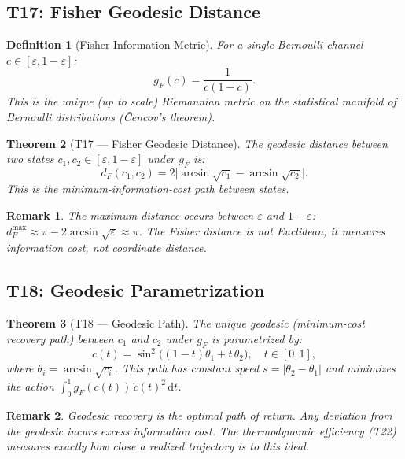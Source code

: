 \documentclass[
  aps,
  prd,
  preprint,
  superscriptaddress,
  nofootinbib,
  floatfix,
  longbibliography
]{revtex4-2}
\newtheorem{theorem}{Theorem}
\newtheorem{definition}[theorem]{Definition}
\newtheorem{remark}{Remark}
\newcommand{\eps}{\varepsilon}
\newcommand{\dd}{\mathrm{d}}
\newcommand{\beq}{\begin{equation}}
\newcommand{\eeq}{\end{equation}}
\newcommand{\dFisher}{d_{\!F}}
\newcommand{\gFisher}{g_{\!F}}
\begin{document}
\subsection{T17: Fisher Geodesic Distance}

\begin{definition}[Fisher Information Metric]\label{def:fisher}
For a single Bernoulli channel $c \in [\eps, 1-\eps]$:
\beq
  \gFisher(c) = \frac{1}{c(1-c)}.
\eeq
This is the unique (up to scale) Riemannian metric
on the statistical manifold of Bernoulli distributions
(Čencov's theorem).
\end{definition}

\begin{theorem}[T17 — Fisher Geodesic Distance]\label{thm:T17}
The geodesic distance between two states
$c_1, c_2 \in [\eps, 1-\eps]$ under $\gFisher$ is:
\beq
  \dFisher(c_1, c_2) =
    2\bigl|\arcsin\!\sqrt{c_1} - \arcsin\!\sqrt{c_2}\bigr|.
\eeq
This is the minimum-information-cost path between states.
\end{theorem}

\begin{remark}
The maximum distance occurs between $\eps$ and $1-\eps$:
$\dFisher^{\max} \approx \pi - 2\arcsin\!\sqrt{\eps} \approx \pi$.
The Fisher distance is not Euclidean; it measures
information cost, not coordinate distance.
\end{remark}

\subsection{T18: Geodesic Parametrization}

\begin{theorem}[T18 — Geodesic Path]\label{thm:T18}
The unique geodesic (minimum-cost recovery path) between
$c_1$ and $c_2$ under $\gFisher$ is parametrized by:
\beq
  c(t) = \sin^2\!\bigl((1-t)\theta_1 + t\,\theta_2\bigr),
  \quad t \in [0,1],
\eeq
where $\theta_i = \arcsin\!\sqrt{c_i}$.
This path has constant speed $\dot{s} = |\theta_2 - \theta_1|$
and minimizes the action
$\int_0^1 \gFisher(c(t))\,\dot{c}(t)^2\,\dd t$.
\end{theorem}

\begin{remark}
Geodesic recovery is the \emph{optimal} path of return.
Any deviation from the geodesic incurs excess information cost.
The thermodynamic efficiency (T22) measures exactly how close
a realized trajectory is to this ideal.
\end{remark}
\end{document}
